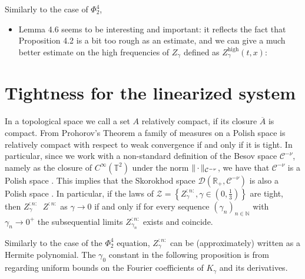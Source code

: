 \documentclass{report}
\newcommand{\NN}{\mathbb{N}}
\newcommand{\RR}{\mathbb{R}}
\newcommand{\TT}{\mathbb{T}}
\DeclarePairedDelimiter\norm{\lVert}{\rVert}%
\newcommand{\Placeholder}{\,\mathrel{\cdot}\,}
\newcommand{\Closure}[1]{\overline{#1}}
\DeclareMathOperator{\DConv}{\stackrel{(d)}{\longrightarrow}}
\theoremstyle{remark}
\theoremstyle{definition}
\newcommand{\TODO}[1]{\text{\textcolor{red}{TODO: #1}}\xspace}
\begin{document}
Similarly to the case of $\Phi^4_2$, 
\TODO{maybe mention Lemma 4.6, but probably not:}
\begin{itemize}
    \item Lemma 4.6 seems to be interesting and important: it reflects the fact that Proposition 4.2 is a bit too rough as an estimate, and we can give a much better estimate on the high frequencies of $Z_\gamma$ defined as $Z_\gamma^{\text{high}}(t, x)$:
\end{itemize}
\chapter{Tightness for the linearized system}
In a topological space we call a set $A$ relatively compact, if its closure $\Closure{A}$ is compact. From Prohorov's Theorem \cite[Theorem 5.1. and Theorem 5.2.]{billingsley2013convergence} a family of measures on a Polish space is relatively compact with respect to weak convergence if and only if it is tight. In particular, since we work with a non-standard definition of the Besov space $\mathcal{C}^{-\nu}$, namely as the closure of $C^\infty\left(\TT^2\right)$ under the norm $\norm{\Placeholder}_{\mathcal{C}^{-\nu}}$, we have that $\mathcal{C}^{-\nu}$ is a Polish space \cite[p70]{mourrat2015convergencetwodimensionaldynamicisingkac}. This implies that the Skorokhod space $\mathcal{D}(\RR_+, \mathcal{C}^{-\nu})$ is also a Polish space \cite[Theorem 12.2.]{billingsley2013convergence}. In particular, if the laws of $\mathcal{Z} = \left\{Z^{:n:}_\gamma, \gamma \in (0, \frac{1}{3})\right\}$ are tight, then $Z^{:n:}_\gamma \DConv Z^{:n:}$ as $\gamma \to 0$ if and only if for every sequence $(\gamma_n)_{n \in \NN}$ with $\gamma_n \to 0^+$ the subsequential limits $Z^{:n:}_{\gamma_n}$ exists and coincide.

Similarly to the case of the $\Phi^4_2$ equation, $Z^{:n:}_\gamma$ can be (approximately) written as a Hermite polynomial. The $\gamma_0$ constant in the following proposition is from \cite[Lemma 8.2]{mourrat2015convergencetwodimensionaldynamicisingkac} regarding uniform bounds on the Fourier coefficients of $K_\gamma$ and its derivatives.
\end{document}
